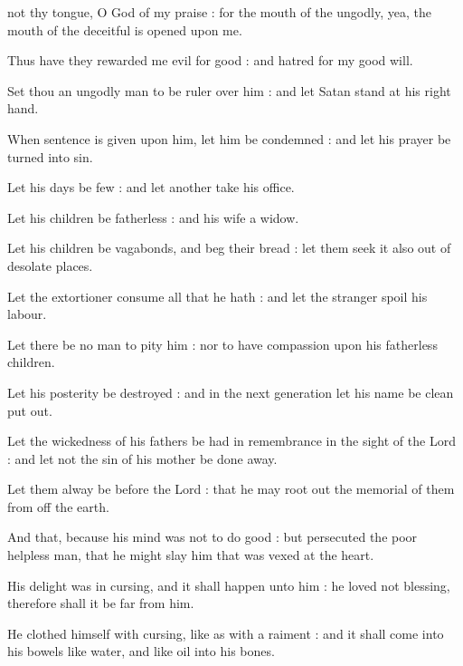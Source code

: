
 not thy tongue, O God of my praise : for the mouth of the ungodly, yea, the mouth of the deceitful is opened upon me.\par
{}
Thus have they rewarded me evil for good : and hatred for my good will.\par
{}Set thou an ungodly man to be ruler over him : and let Satan stand at his right hand.\par
{}When sentence is given upon him, let him be condemned : and let his prayer be turned into sin.\par
{}Let his days be few : and let another take his office.\par
{}Let his children be fatherless : and his wife a widow.\par
{}Let his children be vagabonds, and beg their bread : let them seek it also out of desolate places.\par
{}Let the extortioner consume all that he hath : and let the stranger spoil his labour.\par
{}Let there be no man to pity him : nor to have compassion upon his fatherless children.\par
{}Let his posterity be destroyed : and in the next generation let his name be clean put out.\par
{}Let the wickedness of his fathers be had in remembrance in the sight of the Lord : and let not the sin of his mother be done away.\par
{}Let them alway be before the Lord : that he may root out the memorial of them from off the earth.\par
{}And that, because his mind was not to do good : but persecuted the poor helpless man, that he might slay him that was vexed at the heart.\par
{}His delight was in cursing, and it shall happen unto him : he loved not blessing, therefore shall it be far from him.\par
{}He clothed himself with cursing, like as with a raiment : and it shall come into his bowels like water, and like oil into his bones.\par
